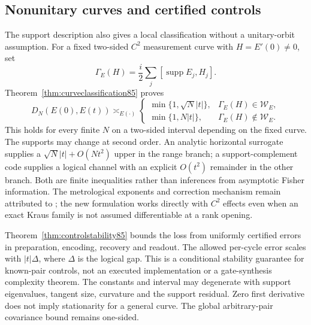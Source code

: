 \subsection{Nonunitary curves and certified controls}
The support description also gives a local classification without a
unitary-orbit assumption.  For a fixed two-sided $C^2$ measurement curve
with $H=E'(0)\ne0$, set
\[
 \Gamma_E(H)=\frac i2\sum_j[\operatorname{supp}E_j,H_j].
\]
Theorem~\ref{thm:curveclassification85} proves
\[
 D_N(E(0),E(t))\asymp_{E(\cdot)}
 \begin{cases}
 \min\{1,\sqrt N|t|\},&\Gamma_E(H)\in\mathcal W_E,\\
 \min\{1,N|t|\},&\Gamma_E(H)\notin\mathcal W_E.
 \end{cases}
\]
This holds for every finite $N$ on a two-sided interval depending on
the fixed curve.  The supports may change at second order.  An analytic
horizontal surrogate supplies a $\sqrt N|t|+O(Nt^2)$ upper in the
range branch; a support-complement code supplies a logical channel
with an explicit $O(t^2)$ remainder in the other branch.  Both are
finite inequalities rather than inferences from asymptotic Fisher
information.  The metrological exponents and correction mechanism
remain attributed to \cite{ZJ84,KL84}; the new formulation works
directly with $C^2$ effects even when an exact Kraus family is not
assumed differentiable at a rank opening.

Theorem~\ref{thm:controlstability85} bounds the loss from uniformly
certified errors in preparation, encoding, recovery and readout.
The allowed per-cycle error scales with $|t|\Delta$, where $\Delta$
is the logical gap.  This is a conditional stability guarantee for
known-pair controls, not an executed implementation or a gate-synthesis
complexity theorem.  The constants and interval may degenerate with
support eigenvalues, tangent size, curvature and the support residual.
Zero first derivative does not imply stationarity for a general curve.
The global arbitrary-pair covariance bound remains one-sided.

